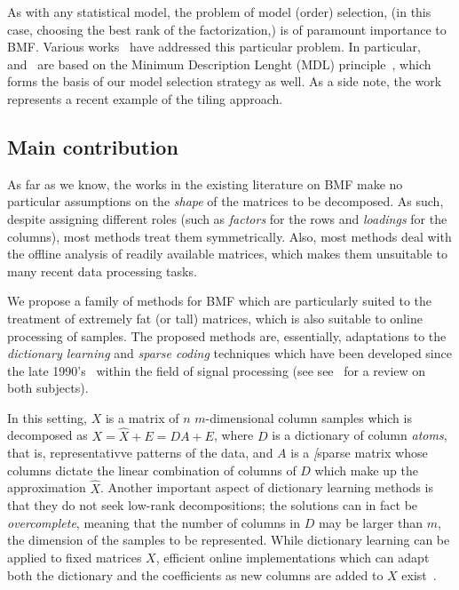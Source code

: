 \documentclass[twocolumn]{IEEEtran}
\theoremstyle{definition}
\begin{document}
As with any statistical model, the problem of model (order) selection, (in this case, choosing the best rank of the factorization,) is of paramount importance to BMF. Various works~\cite{bmf-mdl,bmf-tiling-mdl,bmf-sel} have addressed this particular problem. In particular,~\cite{bmf-mdl} and~\cite{bmf-tiling-mdl} are based on the Minimum Description Lenght (MDL) principle~\cite{mdl1,mdl2,mdl3}, which forms the basis of our model selection strategy as well. As a side note, the work~\cite{bmf-tiling-mdl} represents a recent example of the tiling approach.

\subsection{Main contribution}

As far as we know, the works in the existing literature on BMF make no particular assumptions on the \emph{shape} of the matrices to be decomposed. As such, despite assigning different roles (such as \emph{factors} for the rows and \emph{loadings} for the columns), most methods treat them symmetrically. Also, most methods deal with the offline analysis of 
readily available matrices, which makes them unsuitable to many recent data processing tasks.

We propose a family of methods for BMF which are particularly suited to the treatment of extremely fat (or tall) matrices, which is also suitable to online processing of samples. The proposed methods are, essentially, adaptations to the \emph{dictionary learning} and \emph{sparse coding} techniques which have been developed since the late 1990's~\cite{lewicki99,engan00,aharon06} within the field of signal processing (see see~\cite{dl-review} for a review on both subjects).

In this setting, $X$ is a matrix of $n$ $m$-dimensional column samples which is decomposed as $X=\hat{X}+E=DA+E$, where $D$ is a dictionary of column \emph{atoms}, that is, representativve patterns of the data, and $A$ is a \emph[{sparse} matrix whose columns dictate the linear combination of columns of $D$ which make up the approximation $\hat{X}$. Another important aspect of dictionary learning methods is that they do not seek low-rank decompositions; the solutions can in fact be \emph{overcomplete}, meaning that the number of columns in $D$ may be larger than $m$, the dimension of the samples to be represented. While dictionary learning can be applied to fixed matrices $X$, efficient online implementations which can adapt both the dictionary and the coefficients as new columns are added to $X$ exist~\cite{online-dl}.
\end{document}
